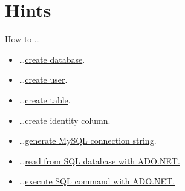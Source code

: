 \documentclass[12pt]{article}
\begin{document}
\clearpage

\section*{Hints}
How to \dots
\begin{itemize}
\item \dots \href{https://dev.mysql.com/doc/refman/5.7/en/creating-database.html}{create database}.
\item \dots \href{https://www.digitalocean.com/community/tutorials/mysql-ru}{create user}.
\item \dots \href{https://dev.mysql.com/doc/refman/5.5/en/creating-tables.html}{create table}.
\item \dots \href{https://dev.mysql.com/doc/refman/5.7/en/example-auto-increment.html}{create identity column}.
\item \dots \href{https://www.connectionstrings.com/mysql/}{generate MySQL connection string}.
\item \dots \href{https://stackoverflow.com/questions/6073382/read-sql-table-into-c-sharp-datatable}{read from SQL database with ADO.NET.}
\item \dots \href{https://docs.microsoft.com/en-us/dotnet/framework/data/adonet/executing-a-command}{execute SQL command with ADO.NET.}

\end{itemize}
\end{document}
